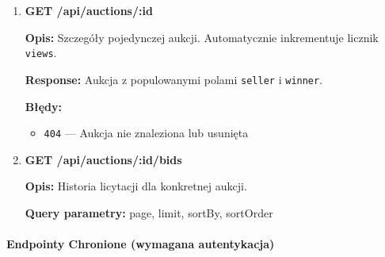 \begin{enumerate}
        \textbf{Implementacja:} Wykorzystuje indeks tekstowy MongoDB (\texttt{\$text: \{ \$search: query \}}) z sortowaniem po \texttt{textScore}.

  \item \textbf{GET /api/auctions/:id}

        \textbf{Opis:} Szczegóły pojedynczej aukcji. Automatycznie inkrementuje licznik \texttt{views}.

        \textbf{Response:} Aukcja z populowanymi polami \texttt{seller} i \texttt{winner}.

        \textbf{Błędy:}
        \begin{itemize}
          \item \texttt{404} --- Aukcja nie znaleziona lub usunięta
        \end{itemize}

  \item \textbf{GET /api/auctions/:id/bids}

        \textbf{Opis:} Historia licytacji dla konkretnej aukcji.

        \textbf{Query parametry:} page, limit, sortBy, sortOrder
\end{enumerate}

\paragraph{Endpointy Chronione (wymagana autentykacja)}

